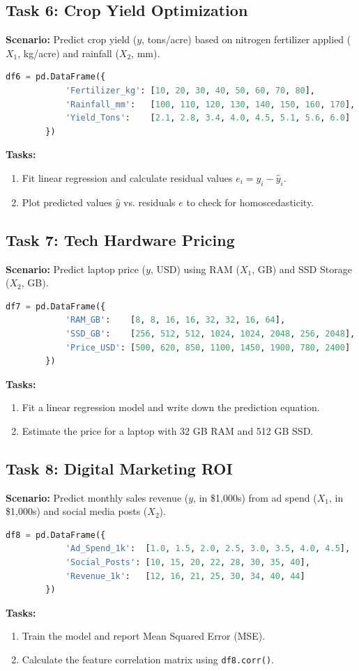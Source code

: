 \documentclass[11pt,a4paper]{article}
\begin{document}
	\pagebreak
	
	\subsection{Task 6: Crop Yield Optimization}
	\textbf{Scenario:} Predict crop yield ($y$, tons/acre) based on nitrogen fertilizer applied ($X_1$, kg/acre) and rainfall ($X_2$, mm).
	\begin{lstlisting}[language=Python]
		df6 = pd.DataFrame({
			'Fertilizer_kg': [10, 20, 30, 40, 50, 60, 70, 80],
			'Rainfall_mm':   [100, 110, 120, 130, 140, 150, 160, 170],
			'Yield_Tons':    [2.1, 2.8, 3.4, 4.0, 4.5, 5.1, 5.6, 6.0]
		})
	\end{lstlisting}
	\textbf{Tasks:}
	\begin{enumerate}
		\item Fit linear regression and calculate residual values $e_i = y_i - \hat{y}_i$.
		\item Plot predicted values $\hat{y}$ vs. residuals $e$ to check for homoscedasticity.
	\end{enumerate}
	
	\subsection{Task 7: Tech Hardware Pricing}
	\textbf{Scenario:} Predict laptop price ($y$, USD) using RAM ($X_1$, GB) and SSD Storage ($X_2$, GB).
	\begin{lstlisting}[language=Python]
		df7 = pd.DataFrame({
			'RAM_GB':    [8, 8, 16, 16, 32, 32, 16, 64],
			'SSD_GB':    [256, 512, 512, 1024, 1024, 2048, 256, 2048],
			'Price_USD': [500, 620, 850, 1100, 1450, 1900, 780, 2400]
		})
	\end{lstlisting}
	\textbf{Tasks:}
	\begin{enumerate}
		\item Fit a linear regression model and write down the prediction equation.
		\item Estimate the price for a laptop with 32 GB RAM and 512 GB SSD.
	\end{enumerate}
	
	\subsection{Task 8: Digital Marketing ROI}
	\textbf{Scenario:} Predict monthly sales revenue ($y$, in \$1,000s) from ad spend ($X_1$, in \$1,000s) and social media posts ($X_2$).
	\begin{lstlisting}[language=Python]
		df8 = pd.DataFrame({
			'Ad_Spend_1k':  [1.0, 1.5, 2.0, 2.5, 3.0, 3.5, 4.0, 4.5],
			'Social_Posts': [10, 15, 20, 22, 28, 30, 35, 40],
			'Revenue_1k':   [12, 16, 21, 25, 30, 34, 40, 44]
		})
	\end{lstlisting}
	\textbf{Tasks:}
	\begin{enumerate}
		\item Train the model and report Mean Squared Error (MSE).
		\item Calculate the feature correlation matrix using \texttt{df8.corr()}.
	\end{enumerate}
	
\end{document}
